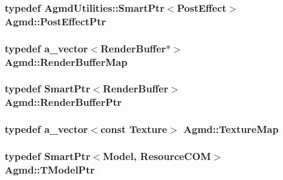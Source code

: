 \hypertarget{namespace_agmd_aded2fb07d1a048d839c8ffeeb56de7cb}{
\subsubsection[{Post\+Effect\+Ptr}]{\setlength{\rightskip}{0pt plus 5cm}typedef {\bf Agmd\+Utilities\+::\+Smart\+Ptr}$<${\bf Post\+Effect}$>$ {\bf Agmd\+::\+Post\+Effect\+Ptr}}}\label{namespace_agmd_aded2fb07d1a048d839c8ffeeb56de7cb}
\hypertarget{namespace_agmd_a6e9a7cfb1414faf52f6290cf604872a9}{
\subsubsection[{Render\+Buffer\+Map}]{\setlength{\rightskip}{0pt plus 5cm}typedef {\bf a\+\_\+vector}$<${\bf Render\+Buffer}$\ast$$>$ {\bf Agmd\+::\+Render\+Buffer\+Map}}}\label{namespace_agmd_a6e9a7cfb1414faf52f6290cf604872a9}
\hypertarget{namespace_agmd_a5369c7994075d92fc9a7ed9039ec0ece}{
\subsubsection[{Render\+Buffer\+Ptr}]{\setlength{\rightskip}{0pt plus 5cm}typedef {\bf Smart\+Ptr}$<${\bf Render\+Buffer}$>$ {\bf Agmd\+::\+Render\+Buffer\+Ptr}}}\label{namespace_agmd_a5369c7994075d92fc9a7ed9039ec0ece}
\hypertarget{namespace_agmd_aee41a562679bc3f0f62073c46a692c4c}{
\subsubsection[{Texture\+Map}]{\setlength{\rightskip}{0pt plus 5cm}typedef {\bf a\+\_\+vector}$<$const {\bf Texture}$>$ {\bf Agmd\+::\+Texture\+Map}}}\label{namespace_agmd_aee41a562679bc3f0f62073c46a692c4c}
\hypertarget{namespace_agmd_ad983a692239653fa2f9dfc95b7c98359}{
\subsubsection[{T\+Model\+Ptr}]{\setlength{\rightskip}{0pt plus 5cm}typedef {\bf Smart\+Ptr}$<${\bf Model}, {\bf Resource\+C\+O\+M}$>$ {\bf Agmd\+::\+T\+Model\+Ptr}}}\label{namespace_agmd_ad983a692239653fa2f9dfc95b7c98359}
